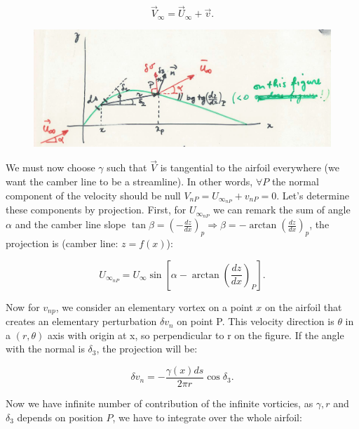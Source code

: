 	\begin{equation}
	\vec{V}_\infty = \vec{U}_\infty + \vec{v}.
	\end{equation}
	
	\begin{figure}
	\vspace{-5mm}
	\includegraphics[scale=0.2]{ch2/33}
	\end{figure}
	We must now choose $\gamma$ such that $\vec{V}$ is tangential to the airfoil everywhere (we want the camber line to be a streamline). In other words, $\forall P$ the normal component of the velocity should be null $V_{nP} = U_{\infty _{nP}} + v_{nP} = 0$. Let's determine these components by projection. First, for $U_{\infty _{nP}}$ we can remark the sum of angle $\alpha$ and the camber line slope $\tan \beta =  \left(-\frac{dz}{dx}\right)_p \Rightarrow \beta = -\arctan \left(\frac{dz}{dx}\right)_p$, the projection is (camber line: $z = f(x)$):
	
	\begin{equation}
	U_{\infty _{nP}} = U_\infty \sin \left[ \alpha - \arctan \left(\frac{dz}{dx} \right)_P \right].
	\label{eq:2.54}
\end{equation}	 

	Now for $v_{np}$, we consider an elementary vortex on a point $x$ on the airfoil that creates an elementary perturbation $\delta v_n$ on point P. This velocity direction is $\theta$ in a $(r,\theta)$ axis with origin at x, so perpendicular to r on the figure. If the angle with the normal is $\delta _3$, the projection will be:
	
	\begin{equation}
	\delta v_n = -\frac{\gamma (x) ds}{2\pi r} \cos \delta _3 .
	\end{equation}
	
	Now we have infinite number of contribution of the infinite vorticies, as $\gamma , r$ and $\delta _3$ depends on position $P$, we have to integrate over the whole airfoil:
	
